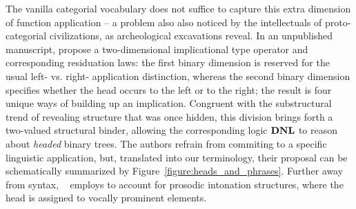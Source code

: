 The vanilla categorial vocabulary does not suffice to capture this extra dimension of function application -- a problem also also noticed by the intellectuals of proto-categorial civilizations, as archeological excavations reveal.
In an unpublished manuscript, \citet{moortgat1991heads} propose a two-dimensional implicational type operator and corresponding residuation laws: the first binary dimension is reserved for the usual left- vs. right- application distinction, whereas the second binary dimension specifies whether the head occurs to the left or to the right; the result is four unique ways of building up an implication.
Congruent with the substructural trend of revealing structure that was once hidden, this division brings forth a two-valued structural binder, allowing the corresponding logic $\textbf{DNL}$ to reason about \textit{headed} binary trees.
The authors refrain from commiting to a specific linguistic application, but, translated into our terminology, their proposal can be schematically summarized by Figure~\ref{figure:heads_and_phrases}.
Further away from syntax, ~\citet{hendriks1997logic} employs  to account for prosodic intonation structures, where the head is assigned to vocally prominent elements.

